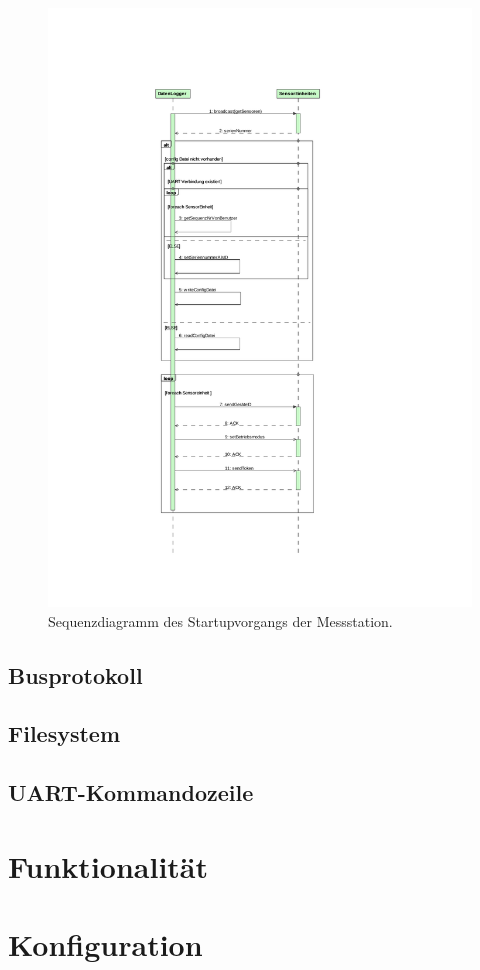 \begin{figure}[H]
	\centering
		\includegraphics[height=0.9\textheight]{images/magicdraw/StartUpSequenz.pdf}
	\caption{Sequenzdiagramm des Startupvorgangs der Messstation.}
	\label{fig.seq_startup}
\end{figure}


\subsection{Busprotokoll}\label{subsec.sw_busprotokoll}

\subsection{Filesystem}\label{subsec.sw_filesystem}

\subsection{UART-Kommandozeile}\label{subsec.sw_uart}

\section{Funktionalität}\label{sec.sw_funktionalitaet}

\section{Konfiguration}\label{sec.sw_konfiguration}
